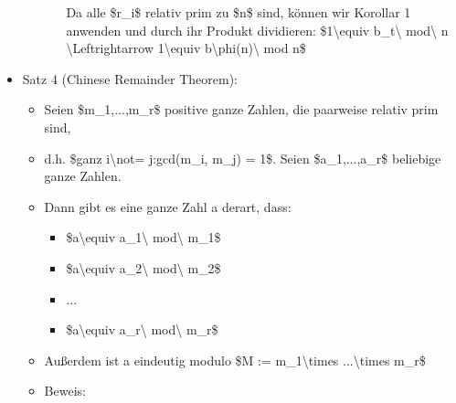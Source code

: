 \documentclass[a4paper]{article}
\begin{document}
\begin{multicols}{3}
\begin{itemize}
\begin{itemize}
\begin{itemize}
                                  Da alle \$r\_i\$ relativ prim zu \$n\$ sind, können wir Korollar 1
                                  anwenden und durch ihr Produkt dividieren: \$1\textbackslash equiv
                                  b\_t\textbackslash{} mod\textbackslash{} n
                                  \textbackslash Leftrightarrow 1\textbackslash equiv
                                  b\textbackslash phi(n)\textbackslash{} mod n\$
                        \end{itemize}
              \end{itemize}
        \item
              Satz 4 (Chinese Remainder Theorem):

              \begin{itemize}
                  \item
                        Seien \$m\_1,...,m\_r\$ positive ganze Zahlen, die paarweise relativ
                        prim sind,
                  \item
                        d.h. \$ganz i\textbackslash not= j:gcd(m\_i, m\_j) = 1\$. Seien
                        \$a\_1,...,a\_r\$ beliebige ganze Zahlen.
                  \item
                        Dann gibt es eine ganze Zahl a derart, dass:

                        \begin{itemize}
                            \item
                                  \$a\textbackslash equiv a\_1\textbackslash{} mod\textbackslash{}
                                  m\_1\$
                            \item
                                  \$a\textbackslash equiv a\_2\textbackslash{} mod\textbackslash{}
                                  m\_2\$
                            \item
                                  ...
                            \item
                                  \$a\textbackslash equiv a\_r\textbackslash{} mod\textbackslash{}
                                  m\_r\$
                        \end{itemize}
                  \item
                        Außerdem ist a eindeutig modulo \$M := m\_1\textbackslash times
                        ...\textbackslash times m\_r\$
                  \item
                        Beweis:


\end{itemize}
\end{itemize}
\end{multicols}
\end{document}
